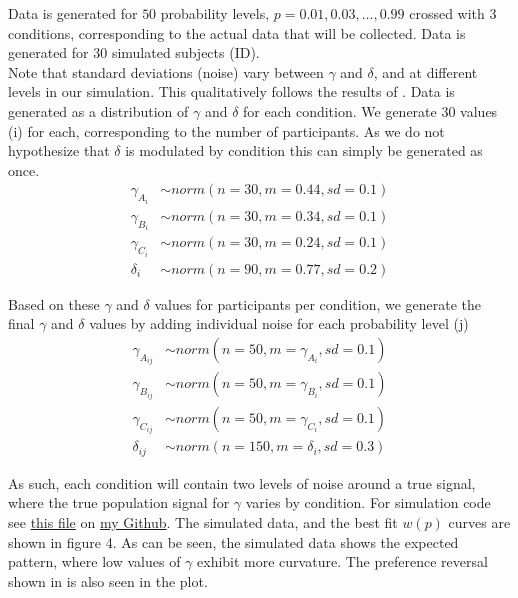 \documentclass[12pt]{article}
\begin{document}
Data is generated for $50$ probability levels,
$p = 0.01, 0.03,  \ldots, 0.99$ crossed with $3$
conditions, corresponding to the actual data
that will be collected.
Data is generated for $30$ simulated subjects (ID). \\

Note that standard deviations (noise) vary
between $\gamma$ and $\delta$, and at
different levels in our simulation. This qualitatively
follows the results of \textcite{gonzalez1999shape}.
Data is generated as a distribution of $\gamma$
and $\delta$ for each condition. We generate
$30$ values (i) for each, corresponding to the
number of participants. As we do not hypothesize
that $\delta$ is modulated by condition
this can simply be generated as once.
\begin{equation} \label{eq1}
\begin{split}
	\gamma_{A_{i}} &\sim norm(n = 30,
	m = 0.44, sd = 0.1) \\
	\gamma_{B_{i}} &\sim norm(n = 30,
	m = 0.34, sd = 0.1) \\
	\gamma_{C_{i}} &\sim norm(n = 30,
	m = 0.24, sd = 0.1) \\
	\delta_i &\sim norm(n = 90,
	m = 0.77, sd = 0.2)
\end{split}
\end{equation}

Based on these $\gamma$ and $\delta$ values for
participants per condition, we generate
the final $\gamma$ and $\delta$ values by
adding individual noise for each probability
level (j)
\begin{equation} \label{eq2}
\begin{split}
	\gamma_{A_{ij}} &\sim norm(n = 50,
	m = \gamma_{A_{i}}, sd = 0.1) \\
	\gamma_{B_{ij}} &\sim norm(n = 50,
	m = \gamma_{B_{i}}, sd = 0.1) \\
	\gamma_{C_{ij}} &\sim norm(n = 50,
	m = \gamma_{C_{i}}, sd = 0.1) \\
	\delta_{ij} &\sim norm(n = 150,
	m = \delta_{i}, sd = 0.3)
\end{split}
\end{equation}

As such, each condition will contain
two levels of noise around a true signal,
where the true population signal for
$\gamma$ varies by condition. For simulation
code see
\href{https://github.com/victor-m-p/BayesianDecisionWeights/blob/main/Code/1_simulate_data.Rmd}{this
file} on \href{https://github.com/victor-m-p/BayesianDecisionWeights}{my
Github}.
The simulated data, and the best fit
$w(p)$ curves are shown in figure 4.
As can be seen, the simulated data shows
the expected pattern, where low values of
$\gamma$ exhibit more curvature. The preference
reversal shown in \textcite{rottenstreich2001money}
is also seen in the plot.
\end{document}
